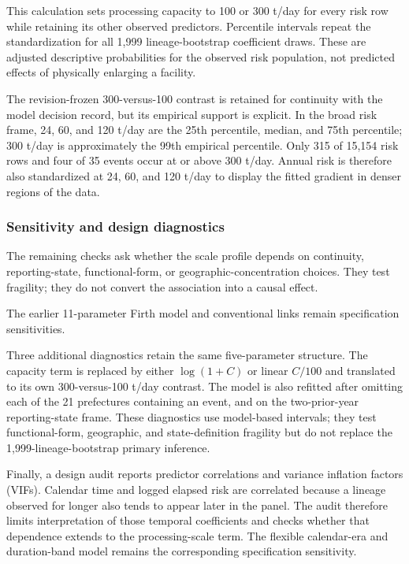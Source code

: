 \documentclass[12pt,a4paper]{article}
\begin{document}
This calculation sets processing capacity to 100 or 300 t/day for every risk
row while retaining its other observed predictors. Percentile intervals repeat
the standardization for all 1,999 lineage-bootstrap coefficient draws. These
are adjusted descriptive probabilities for the observed risk population, not
predicted effects of physically enlarging a facility.

The revision-frozen 300-versus-100 contrast is retained for continuity with the
model decision record, but its empirical support is explicit. In the broad risk frame, 24,
60, and 120 t/day are the 25th percentile, median, and 75th percentile; 300
t/day is approximately the 99th empirical percentile. Only 315 of 15,154 risk
rows and four of 35 events occur at or above 300 t/day. Annual risk is therefore
also standardized at 24, 60, and 120 t/day to display the fitted gradient in
denser regions of the data.

\subsubsection{Sensitivity and design diagnostics}

The remaining checks ask whether the scale profile depends on continuity,
reporting-state, functional-form, or geographic-concentration choices. They
test fragility; they do not convert the association into a causal effect.

The earlier 11-parameter Firth model and conventional links remain
specification sensitivities.

Three additional diagnostics retain the same five-parameter structure. The
capacity term is replaced by either $\log(1+C)$ or linear $C/100$ and translated
to its own 300-versus-100 t/day contrast. The model is also refitted after
omitting each of the 21 prefectures containing an event, and on the
two-prior-year reporting-state frame. These diagnostics use model-based
intervals; they test functional-form, geographic, and state-definition fragility
but do not replace the 1,999-lineage-bootstrap primary inference.

Finally, a design audit reports predictor correlations and variance inflation
factors (VIFs). Calendar time and logged elapsed risk are correlated because a
lineage observed for longer also tends to appear later in the panel. The audit
therefore limits interpretation of those temporal coefficients and checks
whether that dependence extends to the processing-scale term. The flexible
calendar-era and duration-band model remains the corresponding specification
sensitivity.
\end{document}
